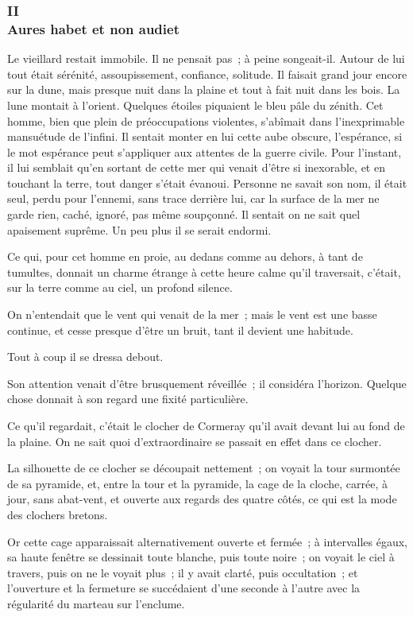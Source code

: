 \documentclass[french,twoside]{book} %
\begin{document}
 \subsubsection[{II. Aures habet et non audiet}]{II \\
Aures habet et non audiet}
\label{p1l4c2}
\noindent Le vieillard restait immobile. Il ne pensait pas ; à peine songeait-il. Autour de lui tout était sérénité, assoupissement, confiance, solitude. Il faisait grand jour encore sur la dune, mais presque nuit dans la plaine et tout à fait nuit dans les bois. La lune montait à l’orient. Quelques étoiles piquaient le bleu pâle du zénith. Cet homme, bien que plein de préoccupations violentes, s’abîmait dans l’inexprimable mansuétude de l’infini. Il sentait monter en lui cette aube obscure, l’espérance, si le mot espérance peut s’appliquer aux attentes de la guerre civile. Pour l’instant, il lui semblait qu’en sortant de cette mer qui venait d’être si inexorable, et en touchant la terre, tout danger s’était évanoui. Personne ne savait son nom, il était seul, perdu pour l’ennemi, sans trace derrière lui, car la surface de la mer ne garde rien, caché, ignoré, pas même soupçonné. Il sentait on ne sait quel apaisement suprême. Un peu plus il se serait endormi.\par
Ce qui, pour cet homme en proie, au dedans comme au dehors, à tant de tumultes, donnait un charme étrange à cette heure calme qu’il traversait,  c’était, sur la terre comme au ciel, un profond silence.\par
On n’entendait que le vent qui venait de la mer ; mais le vent est une basse continue, et cesse presque d’être un bruit, tant il devient une habitude.\par
Tout à coup il se dressa debout.\par
Son attention venait d’être brusquement réveillée ; il considéra l’horizon. Quelque chose donnait à son regard une fixité particulière.\par
Ce qu’il regardait, c’était le clocher de Cormeray qu’il avait devant lui au fond de la plaine. On ne sait quoi d’extraordinaire se passait en effet dans ce clocher.\par
La silhouette de ce clocher se découpait nettement ; on voyait la tour surmontée de sa pyramide, et, entre la tour et la pyramide, la cage de la cloche, carrée, à jour, sans abat-vent, et ouverte aux regards des quatre côtés, ce qui est la mode des clochers bretons.\par
Or cette cage apparaissait alternativement ouverte et fermée ; à intervalles égaux, sa haute fenêtre se dessinait toute blanche, puis toute noire ; on voyait le ciel à travers, puis on ne le voyait plus ; il y avait clarté, puis occultation ; et l’ouverture et la fermeture se succédaient d’une seconde à l’autre avec la régularité du marteau sur l’enclume.\par
\end{document}
